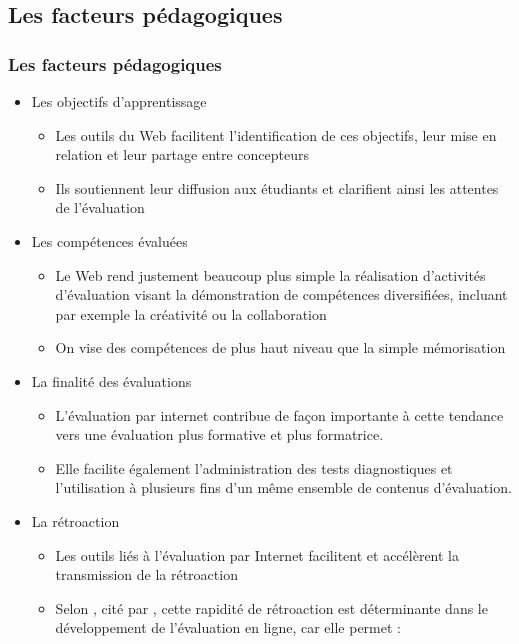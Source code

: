 \documentclass[aspectratio=169]{beamer}
\begin{document}
		\subsection{Les facteurs pédagogiques} 
			\begin{frame}[allowframebreaks]
			 	\frametitle{Les facteurs pédagogiques \citet{audet2011a}}
				\begin {itemize}
					\item Les objectifs d'apprentissage
						\begin {itemize}
							\item Les outils du Web facilitent l'identification de ces objectifs, leur mise en relation et leur partage entre concepteurs
							\item Ils soutiennent leur diffusion aux étudiants et clarifient ainsi les attentes de l'évaluation
						\end{itemize}
					\item Les compétences évaluées
						\begin {itemize}
							\item Le Web rend justement beaucoup plus simple la réalisation d'activités d'évaluation visant la démonstration de compétences diversifiées, incluant par exemple la créativité ou la collaboration
							\item On vise des compétences de plus haut niveau que la simple mémorisation 
						\end{itemize}
					\item La finalité des évaluations
						\begin {itemize}
							\item L'évaluation par internet contribue de façon importante à cette tendance vers une évaluation plus formative et plus formatrice.
							\item Elle facilite également l'administration des tests diagnostiques et l'utilisation à plusieurs fins d'un même ensemble de contenus d'évaluation.					
						\end{itemize}
					\item La rétroaction
						\begin {itemize}
							\item Les outils liés à l'évaluation par Internet facilitent et accélèrent la transmission de la rétroaction
							\item Selon \citet{whitelock2006a}, cité par \citet{audet2011a}, cette rapidité de rétroaction est déterminante dans le développement de l'évaluation en ligne, car elle permet :
								\begin {itemize}

\end{itemize}
\end{itemize}
\end{itemize}
\end{frame}
\end{document}
